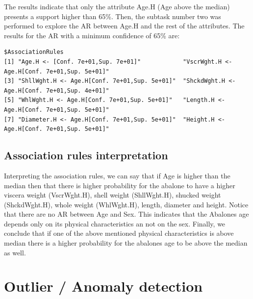 \documentclass[10pt, paper=a4]{article}
\begin{document}
The results indicate that only the attribute Age.H (Age above the median)
presents a support higher than 65\%.  Then, the subtask number two was performed
to explore the AR between Age.H and the rest of the attributes.  The results for
the AR with a minimum confidence of 65\% are:
\begin{verbatim}
$AssociationRules
[1] "Age.H <- [Conf. 7e+01,Sup. 7e+01]"            "VscrWght.H <- Age.H[Conf. 7e+01,Sup. 5e+01]" 
[3] "ShllWght.H <- Age.H[Conf. 7e+01,Sup. 5e+01]"  "ShckdWght.H <- Age.H[Conf. 7e+01,Sup. 4e+01]"
[5] "WhlWght.H <- Age.H[Conf. 7e+01,Sup. 5e+01]"   "Length.H <- Age.H[Conf. 7e+01,Sup. 5e+01]"   
[7] "Diameter.H <- Age.H[Conf. 7e+01,Sup. 5e+01]"  "Height.H <- Age.H[Conf. 7e+01,Sup. 5e+01]"
\end{verbatim}

\subsection{Association rules interpretation}
Interpreting the association rules, we can say that if Age is higher than the
median then that there is higher probability for the abalone to have a higher
viscera weight (VscrWght.H), shell weight (ShllWght.H), shucked weight
(ShckdWght.H), whole weight (WhlWght.H), length, diameter and height.  Notice
that there are no AR between Age and Sex.  This indicates that the Abalones age
depends only on its physical characteristics an not on the sex. Finally, we conclude 
that if one of the above mentioned physical characteristics is above median there is a higher probability for the abalones age to be above the median as well.

\section{Outlier / Anomaly detection}
\label{sec:detection}

\end{document}
